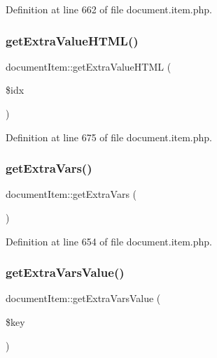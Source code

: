 Definition at line 662 of file document.\+item.\+php.

\mbox{\label{classdocumentItem_a0100c3b24a5c4b75b0edc1bfd139e77a}} 
\subsubsection{\texorpdfstring{get\+Extra\+Value\+H\+T\+M\+L()}{getExtraValueHTML()}}
{\footnotesize\ttfamily document\+Item\+::get\+Extra\+Value\+H\+T\+ML (\begin{DoxyParamCaption}\item[{}]{\$idx }\end{DoxyParamCaption})}



Definition at line 675 of file document.\+item.\+php.

\mbox{\label{classdocumentItem_afe41c70dfb21cc8b8d397a3af24eb895}} 
\subsubsection{\texorpdfstring{get\+Extra\+Vars()}{getExtraVars()}}
{\footnotesize\ttfamily document\+Item\+::get\+Extra\+Vars (\begin{DoxyParamCaption}{ }\end{DoxyParamCaption})}



Definition at line 654 of file document.\+item.\+php.

\mbox{\label{classdocumentItem_ab555cb21a9a50d683836b8d4604d47f5}} 
\subsubsection{\texorpdfstring{get\+Extra\+Vars\+Value()}{getExtraVarsValue()}}
{\footnotesize\ttfamily document\+Item\+::get\+Extra\+Vars\+Value (\begin{DoxyParamCaption}\item[{}]{\$key }\end{DoxyParamCaption})}



